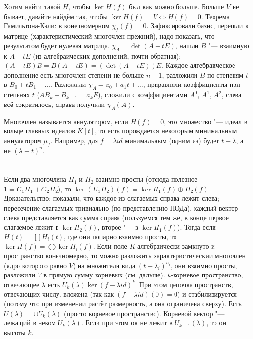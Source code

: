 \section{} %
Хотим найти такой $H$, чтобы $\ker H(f)$ был как можно больше.
Больше $V$ не бывает, давайте найдём так, чтобы $\ker H(f) = V \iff H(f) = 0$.
Теорема Гамильтона-Кэли: в конечномерном $\chi_f(f) = 0$.
Зафиксировали базис, перешли к матрице (характеристический многочлен прежний), надо показать, что результатом будет нулевая матрица.
$\chi_A=\det (A - tE)$, нашли $B$ "--- взаимную к $A-tE$ (из алгебраических дополнений, почти обратная): $(A-tE)B=B(A-tE)=(\det(A-tE))E$.
Каждое алгебраическое дополнение есть многочлен степени не больше $n-1$, разложили $B$ по степеням $t$ в $B_0+tB_1+\dots$.
Разложили $\chi_A=a_0+a_1t+\dots$, приравняли коэффициенты при степенях $t$ ($AB_k-B_{k-1}=a_kE$), сложили с коэффициентами $A^0$, $A^1$, $A^2$, слева всё сократилось,
справа получили $\chi_A(A)$.

Многочлен называется аннулятором, если $H(f) = 0$, это множество "--- идеал в кольце главных идеалов $K[t]$, то есть порождается некоторым минимальным аннулятором $\mu_f$.
Например, для $f=\lambda id$ минимальным (одним из) будет $t-\lambda$, а не $(\lambda - t)^n$.

\section{} %
Если два многочлена $H_1$ и $H_2$ взаимно просты (отсюда полезное $1=G_1H_1+G_2H_2$), то $\ker (H_1H_2)(f) = \ker H_1(f) \oplus H_2(f)$.
Доказательство:
показали, что каждое из слагаемых справа лежит слева;
пересечение слагаемых тривиально (по представлению НОДа),
каждый вектор слева представляется как сумма справа (пользуемся тем же, в конце первое слагаемое лежит в $\ker H_2(f)$, второе "--- в $\ker H_1(f)$).
Тогда если $H(t)=\prod H_i(t)$, где они попарно взаимно просты, то $\ker H(f) = \bigoplus \ker H_i(f)$.
Если поле $K$ алгебраически замкнуто и пространство конечномерно, то можно разложить характеристический многочлен (ядро которого равно $V$)
на множители вида $(t-\lambda_i)^{a_i}$, они взаимно просты, разложили $V$ в прямую сумму корневых (см. дальше).
$k$-корневое пространство, отвечающее $\lambda$ есть $U_k(\lambda) \ker (f-\lambda id)^k$.
При этом цепочка пространств, отвечающих числу, вложена (так как $(f-\lambda id)(0)=0$) и стабилизируется (потому что при изменении растёт размерность, а она ограничена сверху).
Есть $U(\lambda) = \cup U_k(\lambda)$ (просто корневое пространство).
Корневой вектор "--- лежащий в неком $U_k(\lambda)$.
Если при этом он не лежит в $U_{k-1}(\lambda)$, то он высоты $k$.


